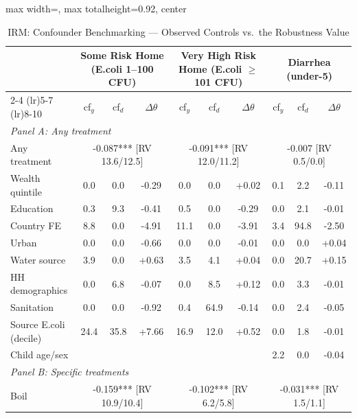 \begin{landscape}
\begin{table}[htbp]
\centering
\caption{IRM: Confounder Benchmarking --- Observed Controls vs.\ the Robustness Value}
\label{tab:sensitivity-benchmark-irm}
\scriptsize
\setlength{\tabcolsep}{3pt}
\renewcommand{\arraystretch}{0.92}
\begin{adjustbox}{max width=\linewidth, max totalheight=0.92\textheight, center}
\begin{tabular}{l|ccc|ccc|ccc}
\toprule
 & \multicolumn{3}{c|}{Some Risk Home (E.coli 1--100 CFU)} & \multicolumn{3}{c|}{Very High Risk Home (E.coli $\geq$ 101 CFU)} & \multicolumn{3}{c}{Diarrhea (under-5)} \\
\cmidrule(lr){2-4} \cmidrule(lr){5-7} \cmidrule(lr){8-10}
 & cf$_y$ & cf$_d$ & $\Delta\theta$ & cf$_y$ & cf$_d$ & $\Delta\theta$ & cf$_y$ & cf$_d$ & $\Delta\theta$ \\
\midrule
\multicolumn{10}{l}{\textit{Panel A: Any treatment}} \\
Any treatment & \multicolumn{3}{c|}{-0.087*** {\scriptsize[RV 13.6/12.5]}} & \multicolumn{3}{c|}{-0.091*** {\scriptsize[RV 12.0/11.2]}} & \multicolumn{3}{c}{-0.007 {\scriptsize[RV 0.5/0.0]}} \\
\quad Wealth quintile & 0.0 & 0.0 & -0.29 & 0.0 & 0.0 & +0.02 & 0.1 & 2.2 & -0.11 \\
\quad Education & 0.3 & 9.3 & -0.41 & 0.5 & 0.0 & -0.29 & 0.0 & 2.1 & -0.01 \\
\quad Country FE & 8.8 & 0.0 & -4.91 & 11.1 & 0.0 & -3.91 & 3.4 & 94.8 & -2.50 \\
\quad Urban & 0.0 & 0.0 & -0.66 & 0.0 & 0.0 & -0.01 & 0.0 & 0.0 & +0.04 \\
\quad Water source & 3.9 & 0.0 & +0.63 & 3.5 & 4.1 & +0.04 & 0.0 & 20.7 & +0.15 \\
\quad HH demographics & 0.0 & 6.8 & -0.07 & 0.0 & 8.5 & +0.12 & 0.0 & 3.3 & -0.01 \\
\quad Sanitation & 0.0 & 0.0 & -0.92 & 0.4 & 64.9 & -0.14 & 0.0 & 2.4 & -0.05 \\
\quad Source E.coli (decile) & 24.4 & 35.8 & +7.66 & 16.9 & 12.0 & +0.52 & 0.0 & 1.8 & -0.01 \\
\quad Child age/sex &  &  &  &  &  &  & 2.2 & 0.0 & -0.04 \\
\midrule
\multicolumn{10}{l}{\textit{Panel B: Specific treatments}} \\
Boil & \multicolumn{3}{c|}{-0.159*** {\scriptsize[RV 10.9/10.4]}} & \multicolumn{3}{c|}{-0.102*** {\scriptsize[RV 6.2/5.8]}} & \multicolumn{3}{c}{-0.031*** {\scriptsize[RV 1.5/1.1]}} \\

\end{tabular}
\end{adjustbox}
\end{table}
\end{landscape}
